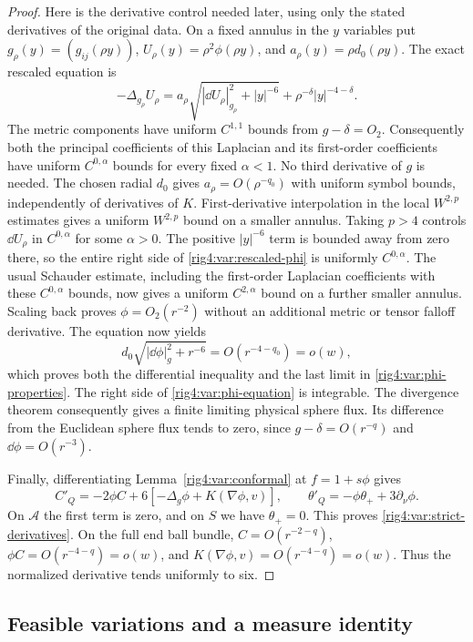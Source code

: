 \begin{proof}
Here is the derivative control needed later, using only the stated
derivatives of the original data. On a fixed annulus in the $y$ variables
put $g_\rho(y)=(g_{ij}(\rho y))$, $U_\rho(y)=\rho^2\phi(\rho y)$, and
$a_\rho(y)=\rho d_0(\rho y)$. The exact rescaled equation is
\begin{equation}
 -\Delta_{g_\rho}U_\rho
 =a_\rho\sqrt{|\dd U_\rho|_{g_\rho}^2+|y|^{-6}}
       +\rho^{-\delta}|y|^{-4-\delta}.
\label{rig4:var:rescaled-phi}
\end{equation}
The metric components have uniform $C^{1,1}$ bounds from $g-\delta=O_2$.
Consequently both the principal coefficients of this Laplacian and its
first-order coefficients have uniform $C^{0,\alpha}$ bounds for every
fixed $\alpha<1$. No third derivative of $g$ is needed. The chosen
radial $d_0$ gives $a_\rho=O(\rho^{-q_0})$ with uniform symbol bounds,
independently of derivatives of $K$. First-derivative interpolation in
the local $W^{2,p}$ estimates gives a uniform $W^{2,p}$ bound on a smaller
annulus. Taking $p>4$ controls $\dd U_\rho$ in $C^{0,\alpha}$ for some
$\alpha>0$. The positive $|y|^{-6}$ term is bounded away from zero there,
so the entire right side of \eqref{rig4:var:rescaled-phi} is uniformly
$C^{0,\alpha}$. The usual Schauder estimate, including the first-order
Laplacian coefficients with these $C^{0,\alpha}$ bounds, now gives a
uniform $C^{2,\alpha}$ bound on a further smaller annulus. Scaling back
proves $\phi=O_2(r^{-2})$ without an additional metric or tensor
falloff derivative.
The equation now yields
\[
 d_0\sqrt{|\dd\phi|_g^2+r^{-6}}=O(r^{-4-q_0})=o(w),
\]
which proves both the differential inequality and the last limit in
\eqref{rig4:var:phi-properties}. The right side of \eqref{rig4:var:phi-equation} is
integrable. The divergence theorem consequently gives a finite limiting
physical sphere flux. Its difference from the Euclidean sphere flux tends
to zero, since $g-\delta=O(r^{-q})$ and $\dd\phi=O(r^{-3})$.

Finally, differentiating Lemma~\ref{rig4:var:conformal} at $f=1+s\phi$ gives
\[
 C'_Q=-2\phi C+6[-\Delta_g\phi+K(\nabla\phi,v)],
 \qquad \theta'_Q=-\phi\theta_++3\partial_\nu\phi.
\]
On $\mathcal A$ the first term is zero, and on $S$ we have
$\theta_+=0$. This proves \eqref{rig4:var:strict-derivatives}.
On the full end ball bundle, $C=O(r^{-2-q})$,
$\phi C=O(r^{-4-q})=o(w)$, and
$K(\nabla\phi,v)=O(r^{-4-q})=o(w)$. Thus the normalized derivative tends
uniformly to six.
\end{proof}

\subsection{Feasible variations and a measure identity}

